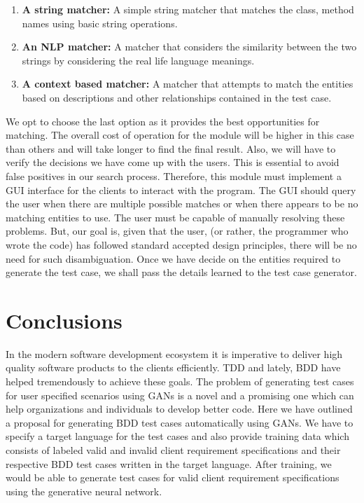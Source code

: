 \documentclass[conference]{IEEEtran}
\begin{document}
\begin{enumerate}
	\item \textbf{A string matcher:} A simple string matcher that matches the class, method names using basic string operations.
	\item \textbf{An NLP matcher:} A matcher that considers the similarity between the two strings by considering the real life language meanings.
	\item \textbf{A context based matcher:} A matcher that attempts to match the entities based on descriptions and other relationships contained in the test case.
\end{enumerate}
 We opt to choose the last option as it provides the best opportunities for matching. The overall cost of operation for the module will be higher in this case than others and will take longer to find the final result.\newline
 Also, we will have to verify the decisions we have come up with the users. This is essential to avoid false positives in our search process. Therefore, this module must implement a GUI interface for the clients to interact with the program. The GUI should query the user when there are multiple possible matches or when there appears to be no matching entities to use. The user must be capable of manually resolving these problems. But, our goal is, given that the user, (or rather, the programmer who wrote the code) has followed standard accepted design principles, there will be no need for such disambiguation.\newline
 Once we have decide on the entities required to generate the test case, we shall pass the details learned to the test case generator.
 

\section{Conclusions}
In the modern software development ecosystem it is imperative to deliver high quality software products to the clients efficiently. TDD and lately, BDD have helped tremendously to achieve these goals. The problem of generating test cases for user specified scenarios using GANs is a novel and a promising one which can help organizations and individuals to develop better code. Here we have outlined a proposal for generating BDD test cases automatically using GANs. We have to specify a target language for the test cases and also provide training data which consists of labeled valid and invalid client requirement specifications and their respective BDD test cases written in the target language. After training, we would be able to generate test cases for valid client requirement specifications using the generative neural network.
\end{document}
